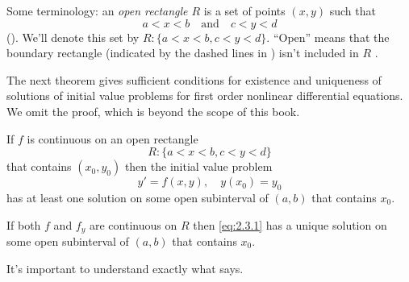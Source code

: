Some terminology:
 an \emph{\color{blue}open rectangle $R$}
 is a set of points $(x,y)$ such that
\[
a<x<b\quad\text{and}\quad c<y<d
\]
 ().  We'll denote this set by
$R:  \{ a < x < b, c < y < d \}$.
 ``Open'' means that the
boundary rectangle (indicated by the dashed lines in
) isn't  included in  $R$ .

The next theorem gives sufficient conditions for existence and
uniqueness of solutions of initial value problems for first order
nonlinear differential equations.
We omit the proof, which is beyond the scope of this book.

\begin{theorem}\label{thmtype:2.3.1}
\begin{alist}
\item %
 If  $f$ is continuous
on an open rectangle
\[
R:  \{ a < x < b, c < y < d \}
\]
 that contains $(x_0,y_0)$
then  the initial value problem
\begin{equation} \label{eq:2.3.1}
y'=f(x,y), \quad y(x_0)=y_0
\end{equation}
 has at least one solution  on some open subinterval
of  $(a,b)$ that contains $x_0$.

\item %
 If  both $f$ and  $f_y$ are
 continuous on $R$ then \eqref{eq:2.3.1} has a unique
solution on some open subinterval  of $(a,b)$ that contains $x_0$.
\end{alist}
\end{theorem}


It's important to understand exactly what 
says.

